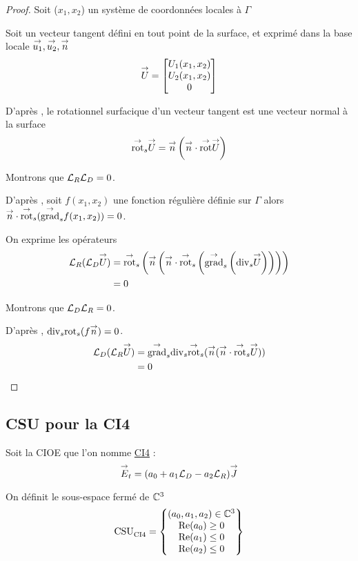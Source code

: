   \begin{proof}
    Soit (\(x_1,x_2\)) un système de coordonnées locales à \(\Gamma\)

    Soit un vecteur tangent défini en tout point de la surface, et exprimé dans la base locale \(\vect{u_1},\vect{u_2},\vect{n}\)
    \[
      \vect{U} = 
      \begin{bmatrix}
        U_1(x_1,x_2)
        \\
        U_2(x_1,x_2)
        \\
        0
      \end{bmatrix}
    \]

    D'après \cite[p.~1028, A3.22]{bladel_electromagnetic_2007}, le rotationnel surfacique d'un vecteur tangent est une vecteur normal à la surface
    \[
      \tvrots{\vect{U}} =\vn \left(\vn\cdot\trot{\vect{U}}\right)
    \]

    Montrons que \(\LR\LD = 0\).

    D’après \cite[p.~1029, A3.42]{bladel_electromagnetic_2007}, soit \(f(x_1,x_2)\) une fonction régulière définie sur \(\Gamma\) alors \(\vn \cdot \tvrots(\tgrads f(x_1,x_2)) = 0\).

    On exprime les opérateurs
    \begin{align*}
      \LR(\LD \vect U)  &= \tvrots \left(\vn \left(\vn \cdot \tvrots \left( \tgrads \left(\tdivs \vect U\right)\right)\right)\right) \\
      &= 0
    \end{align*}

    Montrons que \(\LD\LR = 0\).

    D’après \cite[p.~1029, A3.43]{bladel_electromagnetic_2007}, \(\tdivs \trots (f\vn) = 0\).
    \begin{align*}
      \LD(\LR \vect U) &= \tgrads \tdivs \tvrots (\vn (\vn \cdot \tvrots \vect U)) \\
      &= 0
    \end{align*}
  \end{proof}

\subsection{CSU pour la CI4}
  Soit la CIOE que l'on nomme \hyperlink{ci4}{CI4} :
  \begin{equation}
    \label{eq:unicite:ci4:ci4}
    \vE_t = (a_0 + a_1 \LD - a_2 \LR ) \vJ
  \end{equation}

  \begin{defn}
    \label{def:csu:ci4}

    On définit le sous-espace fermé de \(\CC^3\)
    \begin{equation*}
      \CSU{CI4} = \left\lbrace 
      \begin{matrix}
      (a_0,a_1,a_2) \in \CC^3
      \\
      \Re(a_0) \ge 0
      \\
      \Re(a_1) \le 0
      \\
      \Re(a_2) \le 0
      \end{matrix}
      \right\rbrace
    \end{equation*}
  \end{defn}

